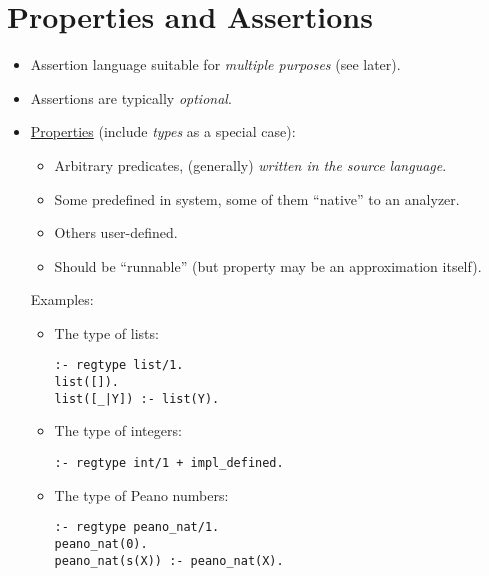 \documentclass{article}
\renewcommand{\_}{\char'137}
\begin{document}
\newpage
\section{Properties and Assertions}
\begin{itemize}
\item Assertion language \cite{assert-lang-ws} suitable for {\em
    multiple purposes} (see later). 
\item Assertions are typically {\em optional}. 

\item \underline{Properties} (include {\em types} as a special case): 
   \begin{itemize}
   \item Arbitrary predicates, (generally) {\em written in the source language}.
   \item Some predefined in system, some of them ``native'' to an analyzer.
   \item Others user-defined.
   \item Should  be ``runnable'' (but property may be an
         approximation itself). 
   \end{itemize}

   Examples:
   \begin{itemize}
   \item The type of lists:
\begin{verbatim}
:- regtype list/1.
list([]).
list([_|Y]) :- list(Y).
\end{verbatim}

   \item The type of integers:
\begin{verbatim}
:- regtype int/1 + impl_defined.
\end{verbatim}

   \item The type of Peano numbers:
\begin{verbatim}
:- regtype peano_nat/1.
peano_nat(0).
peano_nat(s(X)) :- peano_nat(X).
\end{verbatim}


\end{itemize}
\end{itemize}
\end{document}
